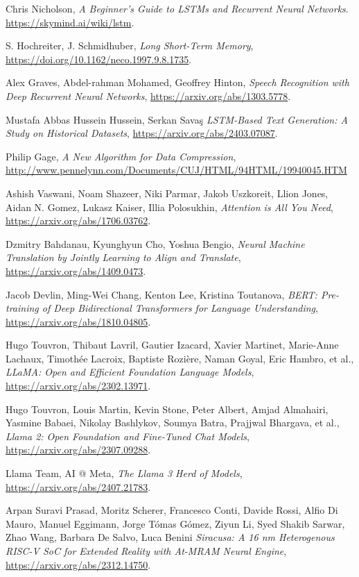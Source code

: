 \begin{thebibliography}{9}
	Chris Nicholson,
	\textit{A Beginner’s Guide to LSTMs and Recurrent Neural Networks}.
	\url{https://skymind.ai/wiki/lstm}.

	S. Hochreiter, J. Schmidhuber,
	\textit{Long Short-Term Memory},
	\url{https://doi.org/10.1162/neco.1997.9.8.1735}.

	Alex Graves, Abdel-rahman Mohamed, Geoffrey Hinton,
	\textit{Speech Recognition with Deep Recurrent Neural Networks},
	\url{https://arxiv.org/abs/1303.5778}.

	Mustafa Abbas Hussein Hussein, Serkan Savaş
	\textit{LSTM-Based Text Generation: A Study on Historical Datasets},
	\url{https://arxiv.org/abs/2403.07087}.

	Philip Gage,
	\textit{A New Algorithm for Data Compression},
	\url{http://www.pennelynn.com/Documents/CUJ/HTML/94HTML/19940045.HTM}

	Ashish Vaswani, Noam Shazeer, Niki Parmar, Jakob Uszkoreit, Llion Jones, Aidan N. Gomez, Lukasz Kaiser, Illia Polosukhin,
	\textit{Attention is All You Need},
	\url{https://arxiv.org/abs/1706.03762}.

	Dzmitry Bahdanau, Kyunghyun Cho, Yoshua Bengio,
	\textit{Neural Machine Translation by Jointly Learning to Align and Translate},
	\url{https://arxiv.org/abs/1409.0473}.
	
	Jacob Devlin, Ming-Wei Chang, Kenton Lee, Kristina Toutanova,
	\textit{BERT: Pre-training of Deep Bidirectional Transformers for Language Understanding},
	\url{https://arxiv.org/abs/1810.04805}.

	Hugo Touvron, Thibaut Lavril, Gautier Izacard, Xavier Martinet, Marie-Anne Lachaux, Timothée Lacroix, Baptiste Rozière, Naman Goyal, Eric Hambro, et al.,
	\textit{LLaMA: Open and Efficient Foundation Language Models},
	\url{https://arxiv.org/abs/2302.13971}.

	Hugo Touvron, Louis Martin, Kevin Stone, Peter Albert, Amjad Almahairi, Yasmine Babaei, Nikolay Bashlykov, Soumya Batra, Prajjwal Bhargava, et al.,
	\textit{Llama 2: Open Foundation and Fine-Tuned Chat Models},
	\url{https://arxiv.org/abs/2307.09288}.

	Llama Team, AI @ Meta,
	\textit{The Llama 3 Herd of Models},
	\url{https://arxiv.org/abs/2407.21783}.

	Arpan Suravi Prasad, Moritz Scherer, Francesco Conti, Davide Rossi, Alfio Di Mauro, Manuel Eggimann, Jorge Tómas Gómez, Ziyun Li, Syed Shakib Sarwar, Zhao Wang, Barbara De Salvo, Luca Benini
	\textit{Siracusa: A 16 nm Heterogenous RISC-V SoC for Extended Reality with At-MRAM Neural Engine},
	\url{https://arxiv.org/abs/2312.14750}.
	

\end{thebibliography}
